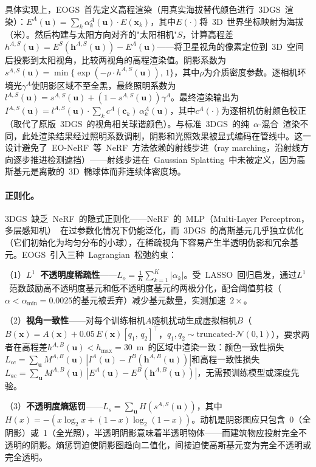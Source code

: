 具体实现上，EOGS~首先定义高程渲染（用真实海拔替代颜色进行~3DGS~渲染）：$E^A(\mathbf{u}) = \sum_{k} \alpha^A_k(\mathbf{u}) \cdot E(\mathbf{x}_k)$，其中$E(\cdot)$将~3D~世界坐标映射为海拔（米）。然后构建与太阳方向对齐的"太阳相机"$S$，计算高程差$h^{A,S}(\mathbf{u}) = E^S(\mathbf{h}^{A,S}(\mathbf{u})) - E^A(\mathbf{u})$——将卫星视角的像素定位到~3D~空间后投影到太阳视角，比较两视角的高程渲染值。阴影系数为$s^{A,S}(\mathbf{u}) = \min\{\exp(-\rho \cdot h^{A,S}(\mathbf{u})),\, 1\}$，其中$\rho$为介质密度参数。逐相机环境光$\gamma^A$使阴影区域不至全黑，最终照明系数为$l^{A,S}(\mathbf{u}) = s^{A,S}(\mathbf{u}) + (1-s^{A,S}(\mathbf{u}))\gamma^A$。最终渲染输出为$I^{A,S}(\mathbf{u}) = l^{A,S}(\mathbf{u}) \cdot \sum_k c^A(\mathbf{c}_k)\,\alpha^A_k(\mathbf{u})$，其中$c^A(\cdot)$为逐相机仿射颜色校正（取代了原版~3DGS~的视角相关球谐颜色）。与标准~3DGS~的纯~$\alpha$-混合~渲染不同，此处渲染结果经过照明系数调制，阴影和光照效果被显式编码在管线中。这一设计避免了~EO-NeRF~等~NeRF~方法依赖的射线步进（ray marching，沿射线方向逐步推进检测遮挡）——射线步进在~Gaussian Splatting~中未被定义，因为高斯基元是离散的~3D~椭球体而非连续体密度场。

\paragraph{正则化。}3DGS~缺乏~NeRF~的隐式正则化——NeRF~的~MLP（Multi-Layer Perceptron，多层感知机）~在过参数化情况下仍能泛化，而~3DGS~的高斯基元几乎独立优化（它们初始化为均匀分布的小球），在稀疏视角下容易产生半透明伪影和冗余基元。EOGS~引入三种~Lagrangian~松弛约束：

（1）\textbf{$L^1$~不透明度稀疏性}——$L_o = \frac{1}{K}\sum_{k=1}^K |\alpha_k|$。受~LASSO~回归启发，通过$L^1$~范数鼓励高不透明度基元和低不透明度基元的两极分化，配合阈值剪枝（$\alpha < \alpha_{\min} = 0.0025$的基元被丢弃）减少基元数量，实测加速~$2\times$。

（2）\textbf{视角一致性}——对每个训练相机$A$随机扰动生成虚拟相机$B$（$B(\mathbf{x}) = A(\mathbf{x}) + 0.05\,E(\mathbf{x})[q_1,\, q_2]^\top$，$q_1,q_2 \sim \text{truncated-}\mathcal{N}(0,1)$），要求两者在高程差$h^{A,B}(\mathbf{u}) < h_{\max} = 30$~m~的区域中渲染一致：颜色一致性损失$L_{cc} = \sum_{\mathbf{u}} M^{A,B}(\mathbf{u})\,|I^A(\mathbf{u}) - I^B(\mathbf{h}^{A,B}(\mathbf{u}))|$和高程一致性损失$L_{ac} = \sum_{\mathbf{u}} M^{A,B}(\mathbf{u})\,|E^A(\mathbf{u}) - E^B(\mathbf{h}^{A,B}(\mathbf{u}))|$，无需预训练模型或深度先验。

（3）\textbf{不透明度熵惩罚}——$L_s = \sum_{\mathbf{u}} H(s^{A,S}(\mathbf{u}))$，其中$H(x) = -(x\log_2 x + (1-x)\log_2(1-x))$。动机是阴影图应只包含~0（全阴影）或~1（全光照），半透明阴影意味着半透明物体——而建筑物应投射完全不透明的阴影。熵惩罚迫使阴影图趋向二值化，间接迫使高斯基元变为完全不透明或完全透明。

